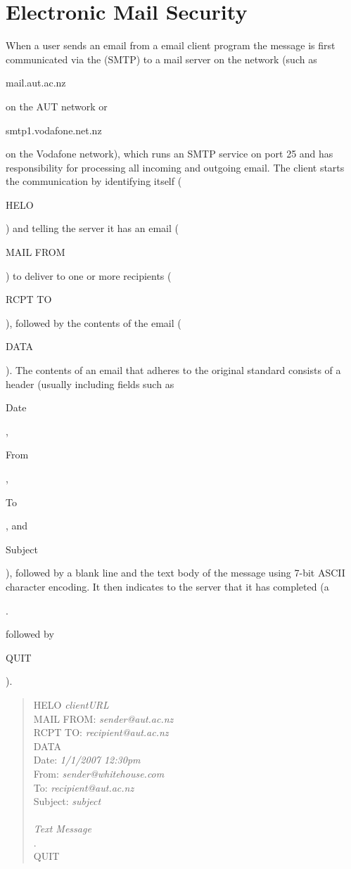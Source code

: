 \section{Electronic Mail Security}
When a user sends an email from a email client program
the message is first communicated via the  (SMTP)
to a mail server on the network
(such as \begin{code}mail.aut.ac.nz\end{code} on the AUT network
or \begin{code}smtp1.voda\-fone.net.nz\end{code} on the Vodafone network),
which runs an SMTP service on port 25 and has responsibility for processing all
incoming and outgoing email.
The client starts the communication by identifying itself (\begin{code}HELO\end{code})
and telling the server it has an email (\begin{code}MAIL FROM\end{code}) to deliver to
one or more recipients (\begin{code}RCPT TO\end{code}), followed by the contents
of the email (\begin{code}DATA\end{code}).
The contents of an email that adheres to the original  standard
consists of a header (usually including fields such
as \begin{code}Date\end{code}, \begin{code}From\end{code}, \begin{code}To\end{code},
and \begin{code}Subject\end{code}), followed by a blank line and the text body
of the message using 7-bit ASCII character encoding.
It then indicates to the server that it has completed
(a \begin{code}.\end{code} followed by \begin{code}QUIT\end{code}).
\begin{quote}\begin{code}
HELO \emph{clientURL} \\
MAIL FROM: \emph{sender@aut.ac.nz} \\
RCPT TO: \emph{recipient@aut.ac.nz} \\
DATA \\
Date: \emph{1/1/2007 12:30pm} \\
From: \emph{sender@whitehouse.com} \\
To: \emph{recipient@aut.ac.nz} \\
Subject: \emph{subject} \\
\\
\emph{Text Message} \\
. \\
QUIT \\
\end{code}\end{quote}
